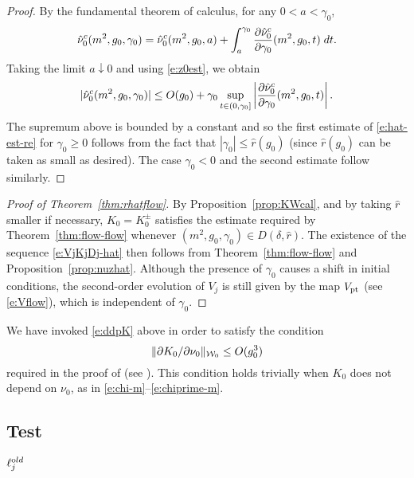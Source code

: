 \begin{proof}
By the fundamental theorem of calculus, for any $0 < a < \gamma_0$,
\begin{equation}
\hat\nu_0^c(m^2, g_0, \gamma_0)
  =
\hat\nu_0^c(m^2, g_0, a)
  +
\int_a^{\gamma_0} \frac{\partial \hat\nu_0^c}{\partial \gamma_0} (m^2, g_0, t) \; dt.
\end{equation}
Taking the limit $a\downarrow 0$ and using \eqref{e:z0est}, we obtain
\begin{equation}
|\hat\nu_0^c(m^2, g_0, \gamma_0)|
  \leq
O(g_0)
  +
\gamma_0
\sup_{t \in (0, \gamma_0]}
\left|\frac{\partial \hat\nu_0^c}{\partial \gamma_0}(m^2, g_0, t)\right|.
\end{equation}
The supremum above is bounded by a constant and so
the first estimate of \eqref{e:hat-est-re} for $\gamma_0 \geq 0$
follows from the fact that $|\gamma_0| \leq \hat r(g_0)$
(since $\hat r(g_0)$ can be taken as small as desired).
The case $\gamma_0 < 0$ and the second estimate follow similarly.
\end{proof}

\begin{proof}[Proof of Theorem~\ref{thm:rhatflow}]
By Proposition~\ref{prop:KWcal},
and by taking $\hat r$ smaller if necessary,
$K_0 = K^\pm_0$ satisfies the estimate required by Theorem~\ref{thm:flow-flow}
whenever $(m^2, g_0, \gamma_0) \in D(\delta, \hat r)$. The
existence of the sequence \eqref{e:VjKjDj-hat} then follows from
Theorem~\ref{thm:flow-flow} and Proposition~\ref{prop:nuzhat}.
Although the presence of $\gamma_0$ causes a shift in initial
conditions, the second-order evolution of $V_j$ is still given by the map
$V_{\rm pt}$ (see \eqref{e:Vflow}),
which is independent of $\gamma_0$.
\end{proof}

\begin{rk}
We have invoked \eqref{e:ddpK} above in order to satisfy the condition
\begin{equation}
\|\partial K_0/\partial\nu_0\|_{\mathcal{W}_0} \le O(g_0^3)
\end{equation}
required in the proof of \cite[Lemma~\ref{log-lem:gzmuprime}]{BBS-saw4-log}
(see \cite[\eqref{log-e:induct1}]{BBS-saw4-log}). This condition holds trivially
when $K_0$ does not depend on $\nu_0$, as in \eqref{e:chi-m}--\eqref{e:chiprime-m}.
\end{rk}

\subsection{Test}

$\ell_j^{\mathrm old}$